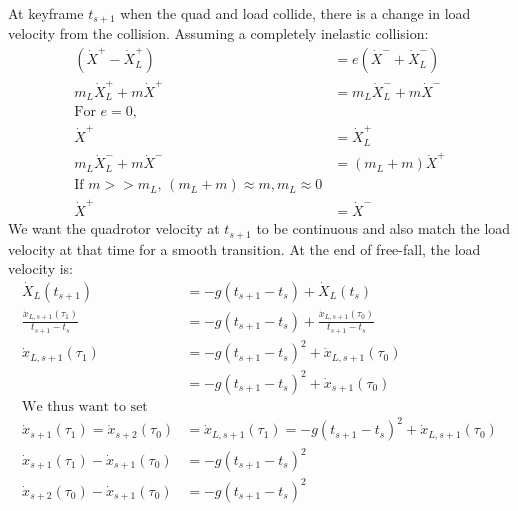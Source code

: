 \documentclass[11pt]{article}
\begin{document}
At keyframe $t_{s+1}$ when the quad and load collide, there is a change in load velocity from the collision. Assuming a completely inelastic collision: 
\begin{align*}
(\dot{X}^+ - \dot{X}_L^+) &= e ( \dot{X}^- + \dot{X}_L^-)\\
m_L \dot{X}_L^+ + m \dot{X}^+ &= m_L \dot{X}_L^- + m \dot{X}^- \\
\text{For $e = 0$, } & \\
\dot{X}^+ &= \dot{X}_L^+ \\
m_L \dot{X}_L^- + m \dot{X}^- &= (m_L+m) \dot{X}^+ \\
\text{If $m >> m_L$, } (m_L+m) \approx m, m_L \approx 0 & \\
 \dot{X}^+ &= \dot{X}^-
\end{align*}
We want the quadrotor velocity at $t_{s+1}$ to be continuous and also match the load velocity at that time for a smooth transition. At the end of free-fall, the load velocity is: 
\begin{align*}
\dot{X}_L(t_{s+1}) &= -g (t_{s+1}-t_s)+\dot{X}_L(t_s) \\
\frac{ \dot{x}_{L, s+1} (\tau_1) }{t_{s+1}-t_s} &= - g (t_{s+1}-t_s)+\frac{ \dot{x}_{L, s+1}(\tau_0) }{ t_{s+1}-t_s } \\
 \dot{x}_{L, s+1}(\tau_1)  &= - g (t_{s+1}-t_s)^2 +  \dot{x}_{L, s+1}(\tau_0) \\
 &= - g (t_{s+1}-t_s)^2 +  \dot{x}_{s+1}(\tau_0) \\
 \text{We thus want to set } & \\
\dot{x}_{s+1}(\tau_1) = \dot{x}_{s+2}(\tau_0) &=   \dot{x}_{L, s+1} (\tau_1) = - g (t_{s+1}-t_s)^2 +  \dot{x}_{L, s+1} (\tau_0) \\
\dot{x}_{s+1} (\tau_1) - \dot{x}_{s+1} (\tau_0) &=    - g (t_{s+1}-t_s)^2  \\
\dot{x}_{s+2}(\tau_0) - \dot{x}_{s+1} (\tau_0) &=  - g (t_{s+1}-t_s)^2  \\
\end{align*}
\end{document}
